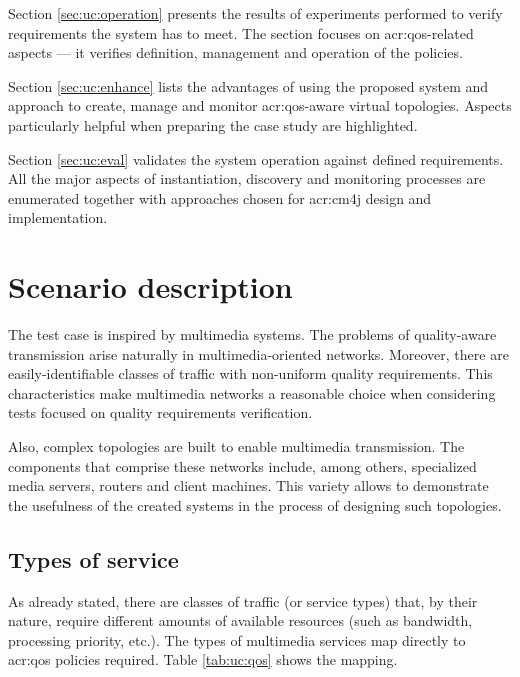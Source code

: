\documentclass[11pt,openany]{book}
\begin{document}
    Section \ref{sec:uc:operation} presents the results of experiments performed to verify requirements the system has
    to meet. The section focuses on \gls{acr:qos}-related aspects --- it verifies definition, management and operation
    of the policies.

    Section \ref{sec:uc:enhance} lists the advantages of using the proposed system and approach to create, manage and
    monitor \gls{acr:qos}-aware virtual topologies. Aspects particularly helpful when preparing the case study are
    highlighted.

    Section \ref{sec:uc:eval} validates the system operation against defined requirements. All the major aspects of
    instantiation, discovery and monitoring processes are enumerated together with approaches chosen for \gls{acr:cm4j}
    design and implementation.


    \section{Scenario description}
    \label{sec:uc:description}

      The test case is inspired by multimedia systems. The problems of quality-aware transmission arise naturally in
      multimedia-oriented networks. Moreover, there are easily-identifiable classes of traffic with non-uniform quality
      requirements. This characteristics make multimedia networks a reasonable choice when considering tests focused on
      quality requirements verification.
      
      Also, complex topologies are built to enable multimedia transmission. The components that comprise these networks
      include, among others, specialized media servers, routers and client machines. This variety allows to demonstrate
      the usefulness of the created systems in the process of designing such topologies.


      \subsection{Types of service}
      
        As already stated, there are classes of traffic (or service types) that, by their nature, require different
        amounts of available resources (such as bandwidth, processing priority, etc.). The types of multimedia services
        map directly to \gls{acr:qos} policies required. Table \ref{tab:uc:qos} shows the mapping.
\end{document}
